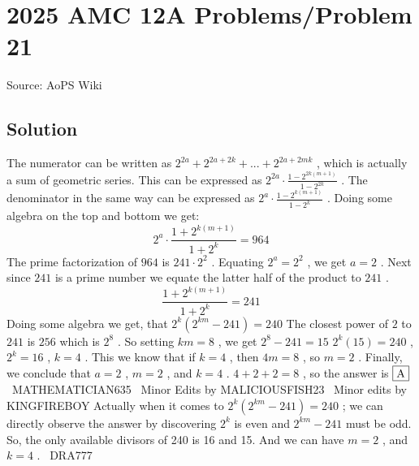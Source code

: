 \documentclass[12pt]{article}
\begin{document}
\section*{{2025 AMC 12A Problems/Problem 21}}
Source: AoPS Wiki

\subsection*{Solution}
The numerator can be written as $2^{2a} +2^{2a+2k}+...+2^{2a+2mk}$ , which is actually a sum of geometric series. This can be expressed as $2^{2a} \cdot \frac{1-2^{2k(m+1)}}{1-2^{2k}}$ . The denominator in the same way can be expressed as $2^a \cdot \frac{1-2^{k(m+1)}}{1-2^k}$ . Doing some algebra on the top and bottom we get: \begin{equation}
2^a \cdot \frac{1+2^{k(m+1)}}{1+2^k} = 964
\end{equation} The prime factorization of $964$ is $241 \cdot 2^2$ . Equating $2^a = 2^2$ , we get $a = 2$ . Next since $241$ is a prime number we equate the latter half of the product to $241$ .
\begin{equation}
\frac{1+2^{k(m+1)}}{1+2^k} = 241
\end{equation}
Doing some algebra we get, that $2^k(2^{km}-241) = 240$ The closest power of $2$ to $241$ is $256$ which is $2^8$ . So setting $km = 8$ , we get $2^8-241 = 15$ $2^k(15) = 240$ , $2^k = 16$ , $k = 4$ . This we know that if $k = 4$ , then $4m = 8$ , so $m = 2$ . Finally, we conclude that $a = 2$ , $m = 2$ , and $k = 4$ . $4+2+2 = 8$ , so the answer is $\fbox{A}$ ~MATHEMATICIAN635
~Minor Edits by MALICIOUSFISH23
~Minor edits by KINGFIREBOY Actually when it comes to $2^k(2^{km}-241) = 240$ ;
we can directly observe the answer by discovering $2^k$ is even and $2^{km}-241$ must be odd. So, the only available divisors of 240 is 16 and 15.
And we can have $m = 2$ , and $k = 4$ . ~DRA777
\end{document}
